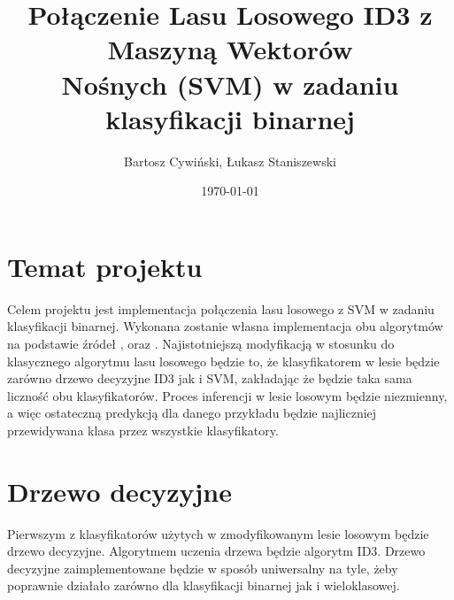\documentclass[
    left=2.5cm,         %
    right=2.5cm,        %
    top=2.5cm,          %
    bottom=3cm,         %
    bindingoffset=6mm,  %
    nohyphenation=false %
]{eiti/eiti-report}
\begin{document}
\title{
    Połączenie Lasu Losowego ID3 z Maszyną Wektorów\\
    Nośnych (SVM) w zadaniu klasyfikacji binarnej
}

\author{Bartosz Cywiński, Łukasz Staniszewski}

\date{\today}
\maketitle

\tableofcontents

\cleardoublepage %
\pagestyle{headings}

\newpage %
\section{Temat projektu}

Celem projektu jest implementacja połączenia lasu losowego z SVM w zadaniu klasyfikacji binarnej. Wykonana zostanie własna implementacja obu algorytmów na podstawie źródeł \cite{wsisvm},  \cite{umasvm} oraz \cite{eslII}. Najistotniejszą modyfikacją w stosunku do klasycznego algorytmu lasu losowego będzie to, że klasyfikatorem w lesie będzie zarówno drzewo decyzyjne ID3 jak i SVM, zakładając że będzie taka sama liczność obu klasyfikatorów. Proces inferencji w lesie losowym będzie niezmienny, a więc ostateczną predykcją dla danego przykładu będzie najliczniej przewidywana klasa przez wszystkie klasyfikatory. 

\section{Drzewo decyzyjne}
Pierwszym z klasyfikatorów użytych w zmodyfikowanym lesie losowym będzie drzewo decyzyjne. Algorytmem uczenia drzewa będzie algorytm ID3. Drzewo decyzyjne zaimplementowane będzie w sposób uniwersalny na tyle, żeby poprawnie działało zarówno dla klasyfikacji binarnej jak i wieloklasowej.
\end{document}
